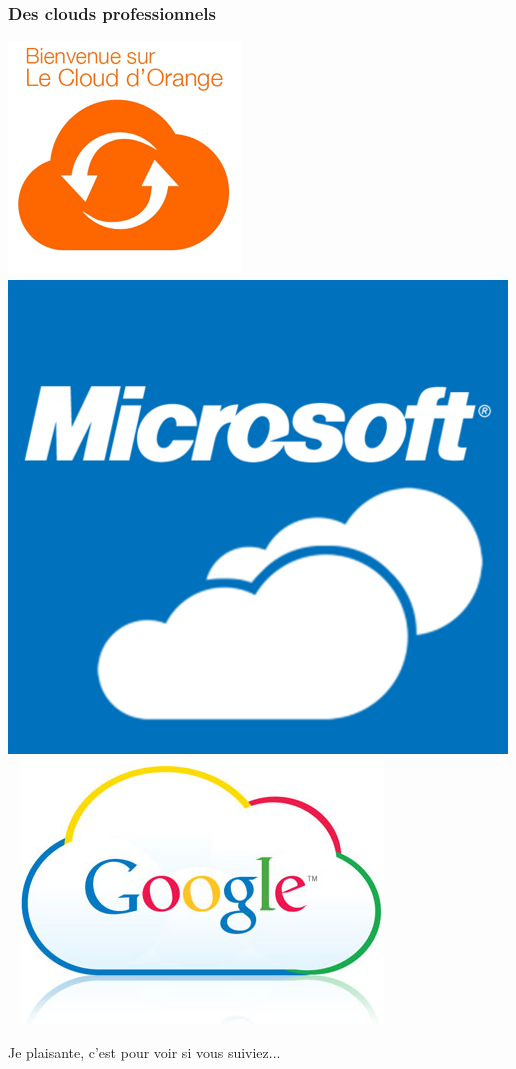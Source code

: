 \documentclass{beamer}
\begin{document}
\begin{frame}
\frametitle{Des clouds professionnels}
\begin{center}
\includegraphics[scale=0.4] {./images/cloud-orange.png}~
\includegraphics[scale=0.4] {./images/cloud-microsoft.png}~
\includegraphics[scale=0.35] {./images/Google-Cloud-Computing.jpg}
\end{center}
\end{frame}
\begin{frame}
\begin{center}
\Huge{Je plaisante, c'est pour voir si vous suiviez...}
\end{center}
\end{frame}
\end{document}
